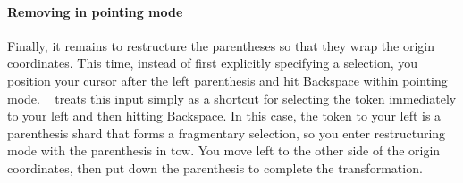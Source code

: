 

\paragraph{Removing in pointing mode}
Finally, it remains to restructure the parentheses
so that they wrap the origin coordinates.
This time, instead of first explicitly specifying a selection,
you position your cursor after the left parenthesis
and hit Backspace within pointing mode.
\tylr~ treats this input simply as a shortcut for selecting the
token immediately to your left and then hitting Backspace.
In this case, the token to your left is a parenthesis
shard that forms a fragmentary selection, so you
enter restructuring mode with the parenthesis in tow.
You move left to the other side of the origin coordinates,
then put down the parenthesis to complete the transformation.








